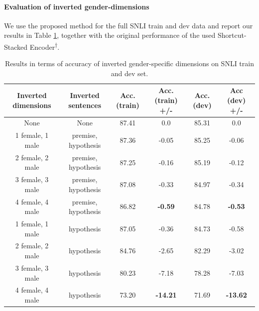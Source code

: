 \paragraph*{Evaluation of inverted gender-dimensions}
We use the proposed method for the full \ac{SNLI} train and dev data and report our results in Table \ref{tab:inverted_mf_results_acc}, together with the original performance of the used Shortcut-Stacked Encoder\textsuperscript{$\dagger$}. 
\begin{table}[tph!]
\centering
\label{tab:inverted_mf_results_acc}
\begin{tabular}{cccccc}
\textbf{Inverted dimensions} & \textbf{Inverted sentences}  & \textbf{Acc. (train)} & \textbf{Acc. (train) +/-} & \textbf{Acc. (dev)} & \textbf{Acc (dev) +/-} \\
\toprule
None                   & None                   & 87.41        & 0.0              & 85.31      & 0.0           \\
\midrule
1 female, 1 male    & premise, hypothesis & 87.36        & -0.05            & 85.25      & -0.06         \\
2 female, 2 male    & premise, hypothesis & 87.25        & -0.16            & 85.19      & -0.12         \\
3 female, 3 male    & premise, hypothesis & 87.08        & -0.33            & 84.97      & -0.34         \\
4 female, 4 male    & premise, hypothesis & 86.82        & \textbf{-0.59}            & 84.78      & \textbf{-0.53}         \\
\midrule
1 female, 1 male    & hypothesis          & 87.05        & -0.36            & 84.73      & -0.58         \\
2 female, 2 male    & hypothesis          & 84.76        & -2.65            & 82.29      & -3.02         \\
3 female, 3 male    & hypothesis          & 80.23        & -7.18            & 78.28      & -7.03         \\
4 female, 4 male    & hypothesis           & 73.20        & \textbf{-14.21}           & 71.69      & \textbf{-13.62}    \\
\bottomrule    
\end{tabular}
\caption{Results in terms of accuracy of inverted gender-specific dimensions on \ac{SNLI} train and dev set.}
\end{table}
